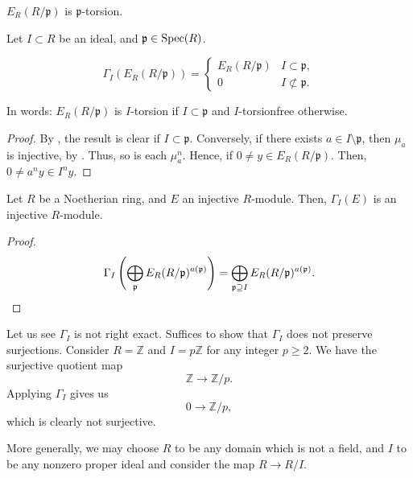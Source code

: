 \begin{por} \label{por:injective-hull-p-torsion}
	$E_{R}(R/\mathfrak{p})$ is $\mathfrak{p}$-torsion.
\end{por}

\begin{cor}
	Let $I \subset R$ be an ideal, and $\mathfrak{p} \in \Spec(R)$. 

	\begin{equation*} 
		\Gamma_{I}(E_{R}(R/\mathfrak{p})) = 
		\begin{cases}
			E_{R}(R/\mathfrak{p}) & I \subset \mathfrak{p}, \\
			0 & I \not\subset \mathfrak{p}.
		\end{cases}
	\end{equation*}

	In words: $E_{R}(R/\mathfrak{p})$ is $I$-torsion if $I \subset \mathfrak{p}$ and $I$-torsionfree otherwise.
\end{cor}
\begin{proof} 
	By , the result is clear if $I \subset \mathfrak{p}$. Conversely, if there exists $a \in I \setminus \mathfrak{p}$, then $\mu_{a}$ is injective, by . Thus, so is each $\mu_{a}^{n}$. Hence, if $0 \neq y \in E_{R}(R/\mathfrak{p})$. Then, $0 \neq a^{n} y \in I^{n} y$.
\end{proof}

\begin{cor}
	Let $R$ be a Noetherian ring, and $E$ an injective $R$-module. Then, $\Gamma_{I}(E)$ is an injective $R$-module.
\end{cor}
\begin{proof} 
	
	\begin{equation*} 
		\Gamma_{I}\left(\bigoplus_{\mathfrak{p}} E_{R}(R/\mathfrak{p})^{a(\mathfrak{p})}\right) = \bigoplus_{\mathfrak{p} \supset I} E_{R}(R/\mathfrak{p})^{a(\mathfrak{p})}. \qedhere
	\end{equation*}
\end{proof}

\begin{ex}
	Let us see $\Gamma_{I}$ is not right exact. Suffices to show that $\Gamma_{I}$ does not preserve surjections. Consider $R = \mathbb{Z}$ and $I = p\mathbb{Z}$ for any integer $p \ge 2$. We have the surjective quotient map
	\begin{equation*} 
		\mathbb{Z} \to \mathbb{Z}/p.
	\end{equation*}
	Applying $\Gamma_{I}$ gives us
	\begin{equation*} 
		0 \to \mathbb{Z}/p,
	\end{equation*}
	which is clearly not surjective.

	More generally, we may choose $R$ to be any domain which is not a field, and $I$ to be any nonzero proper ideal and consider the map $R \to R/I$.
\end{ex}

